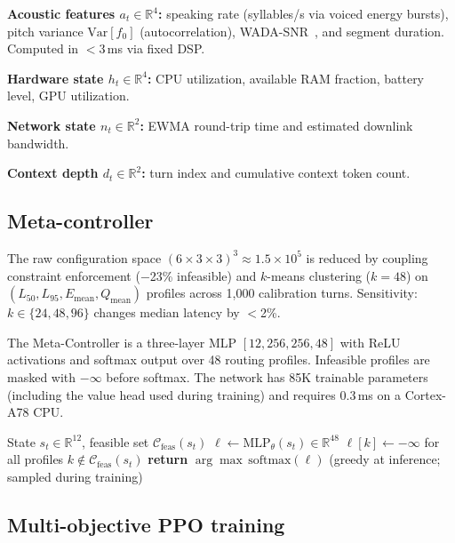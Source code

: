 \documentclass{article}
\begin{document}
\textbf{Acoustic features $a_t\in\mathbb{R}^4$:} speaking rate (syllables/s via voiced energy bursts), pitch variance $\text{Var}[f_0]$ (autocorrelation), WADA-SNR~\citep{kim2008wadasnr}, and segment duration. Computed in $<$3\,ms via fixed DSP.

\textbf{Hardware state $h_t\in\mathbb{R}^4$:} CPU utilization, available RAM fraction, battery level, GPU utilization.

\textbf{Network state $n_t\in\mathbb{R}^2$:} EWMA round-trip time and estimated downlink bandwidth.

\textbf{Context depth $d_t\in\mathbb{R}^2$:} turn index and cumulative context token count.

\subsection{Meta-controller}
\label{sec:mc}

The raw configuration space $(6\times3\times3)^3\approx1.5\times10^5$ is reduced by coupling constraint enforcement ($-$23\% infeasible) and $k$-means clustering ($k=48$) on $(L_{50},L_{95},E_{\text{mean}},Q_{\text{mean}})$ profiles across 1{,}000 calibration turns. Sensitivity: $k\in\{24,48,96\}$ changes median latency by $<$2\%.

The Meta-Controller is a three-layer MLP $[12,256,256,48]$ with ReLU activations and softmax output over 48 routing profiles. Infeasible profiles are masked with $-\infty$ before softmax. The network has 85K trainable parameters (including the value head used during training) and requires 0.3\,ms on a Cortex-A78 CPU.

\begin{algorithm}[t]
\caption{Meta-Controller Inference}
\label{alg:mc}
\begin{algorithmic}[1]
\Require State $s_t\in\mathbb{R}^{12}$, feasible set $\mathcal{C}_{\text{feas}}(s_t)$
\State $\ell\leftarrow\text{MLP}_\theta(s_t)\in\mathbb{R}^{48}$
\State $\ell[k]\leftarrow-\infty$ for all profiles $k\notin\mathcal{C}_{\text{feas}}(s_t)$
\State \textbf{return} $\arg\max\,\text{softmax}(\ell)$ \hfill (greedy at inference; sampled during training)
\end{algorithmic}
\end{algorithm}

\subsection{Multi-objective PPO training}
\end{document}
